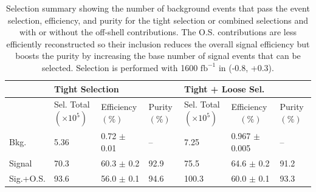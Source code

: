 \begin{table}
\caption{Selection summary showing the number of background events that pass the event selection, efficiency, and purity for the tight selection or combined selections and with or without the off-shell contributions.  The O.S. contributions are less efficiently reconstructed so their inclusion reduces the overall signal efficiency but boosts the purity by increasing the base number of signal events that can be selected. Selection is performed with 1600 $\text{fb}^{-1}$ in (-0.8, +0.3). }
\label{tab:summary}
 \begin{tabular}{ |p{}|p{}p{}|p{}|p{}p{}|p{}|} 
 \hline 
   &  \multicolumn{3}{|l|}{Tight Selection} &  \multicolumn{3}{|l|}{ Tight + Loose Sel.}  \\  \hline  
 & Sel. Total $(\times 10^5)$ & Efficiency $(\%)$ & Purity $(\%)$ & Sel. Total $(\times 10^5)$ & Efficiency $\,\,\,\,$ $(\%)$& Purity $(\%)$ \\ 
 \hline  
 Bkg. &  {5.36} & 0.72 $\pm$ 0.01 & --&  {7.25} & 0.967 $\pm$ 0.005 &--  \\ 
 Signal &  {70.3} & 60.3 $\pm$ 0.2 & 92.9  &  {75.5} & 64.6 $\pm$ 0.2 & 91.2 \\ 
 Sig.+O.S. &  {93.6} & 56.0 $\pm$ 0.1 & 94.6 &  {100.3} & 60.0 $\pm$ 0.1 & 93.3 \\ 
\hline 
\end{tabular} 
\end{table}

